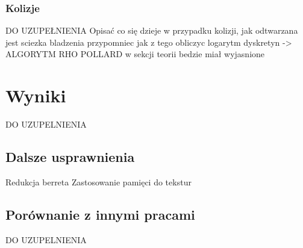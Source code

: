 \subsubsection{Kolizje}
DO UZUPEŁNIENIA
Opisać co się dzieje w przypadku kolizji, jak odtwarzana jest sciezka bladzenia
przypomniec jak z tego obliczyc logarytm dyskretyn -> ALGORYTM RHO POLLARD w sekcji teorii bedzie miał wyjasnione 

\section{Wyniki}

DO UZUPELNIENIA

\subsection{Dalsze usprawnienia}
Redukcja berreta
Zastosowanie pamięci do tekstur

\subsection{Porównanie z innymi pracami}

DO UZUPELNIENIA